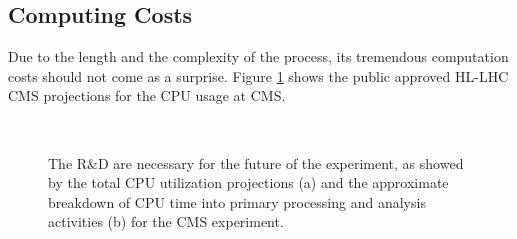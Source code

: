 \subsection{Computing Costs}

Due to the length and the complexity of the process, its tremendous computation costs should not come as a surprise. Figure \ref{fig:cpuusage} shows the public approved HL-LHC CMS projections for the CPU usage at CMS.

\begin{figure}
    \myfloatalign
     \\
    \caption[Computing estimates]{The R$\&$D are necessary for the future of the experiment, as showed by the total CPU utilization projections (a) and the approximate breakdown of CPU time into primary processing and analysis activities (b) for the CMS experiment.}\label{fig:cpuusage}
\end{figure}

